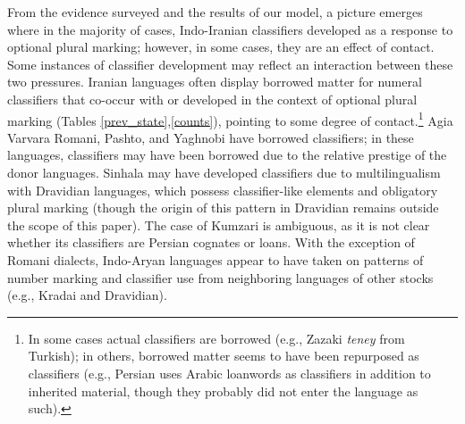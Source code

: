 \documentclass[11pt]{article}
\begin{document}
From the evidence surveyed and the results of our model, a picture emerges where in the majority of cases, Indo-Iranian classifiers developed as a response to optional plural marking; however, in some cases, they are an effect of contact. Some instances of classifier development may reflect an interaction between these two pressures. Iranian languages often display borrowed matter for numeral classifiers that co-occur with or developed in the context of optional plural marking (Tables \ref{prev_state},\ref{counts}), pointing to some degree of contact.\footnote{In some cases actual classifiers are borrowed (e.g., Zazaki {\it teney} from Turkish); in others, borrowed matter seems to have been repurposed as classifiers (e.g., Persian uses Arabic loanwords as classifiers in addition to inherited material, though they probably did not enter the language as such).} 
Agia Varvara Romani, Pashto, and Yaghnobi have borrowed classifiers; in these languages, classifiers may have been borrowed due to the relative prestige of the donor languages. 
Sinhala may have developed classifiers due to multilingualism with Dravidian languages, which possess classifier-like elements and obligatory plural marking (though the origin of this pattern in Dravidian remains outside the scope of this paper). 
The case of Kumzari is ambiguous, as it is not clear whether its classifiers are Persian cognates or loans. 
With the exception of Romani dialects, Indo-Aryan languages appear to have taken on patterns of number marking and classifier use from neighboring languages of other stocks (e.g., Kradai and Dravidian). 
\end{document}
